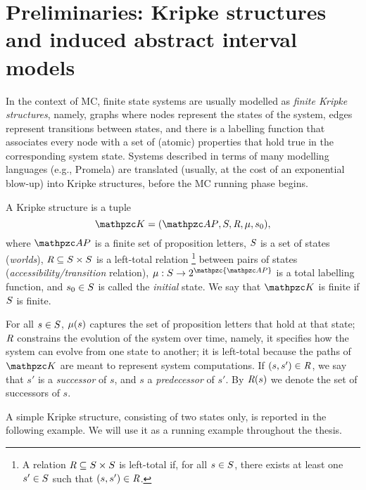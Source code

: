 \section{Preliminaries: Kripke structures and induced abstract interval models}\label{sec:KrAndindAIM}
In the context of MC, finite state systems are usually modelled as \emph{finite Kripke structures}, 
namely, graphs where nodes represent the states of the system, edges represent transitions between states, and there is a labelling function that associates every node with a set of (atomic) properties that hold true in the corresponding system state. %
Systems described in terms of many modelling languages (e.g., Promela) are translated (usually, at the cost of an exponential blow-up) into Kripke structures, before the MC running phase begins. 

\begin{definition}\label{def:kripkestructure}
A Kripke structure is a tuple \[\Ku=\KuDef,\] where $\Prop$ is a finite set of proposition letters, $S$ is a set of states (\emph{worlds}), $\textit{R}\subseteq S\times S$ is a left-total relation%
\footnote{A relation $\textit{R}\subseteq S\times S$ is left-total if, for all $s\in S$, there exists at least one $s'\in S$ such that $(s,s')\in\textit{R}$.}
between pairs of states (\emph{accessibility/transition} relation), $\Lab:\States\to 2^\mathpzc{\Prop}$ is a total labelling function, and $s_0\in S$ is called the \emph{initial} state.
We say that $\Ku$ is finite if $S$ is finite.
\end{definition}
For all $s\in S$, $\mu(s)$ captures the set of proposition letters that hold at that state;
$\textit{R}$ constrains the evolution of the system over time, namely, it specifies how the system can evolve from one state to another; it is left-total because the paths of $\Ku$ are meant to represent 
system computations. 
If $(s,s')\in\textit{R}$, we say that $s'$ is a \emph{successor} of $s$, and $s$ a \emph{predecessor} of $s'$. By $\textit{R}(s)$ we denote the set of successors of $s$.

A simple Kripke structure, consisting of two states only, is reported in the following 
example. We will use it as a running example throughout the thesis.

